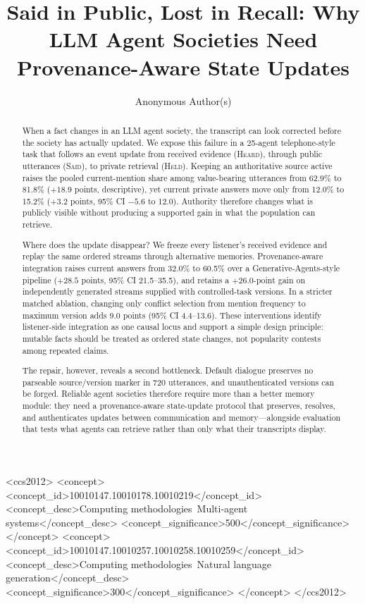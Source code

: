 \documentclass[sigconf,anonymous]{acmart}
\title[Said in Public, Lost in Recall]{Said in Public, Lost in Recall: Why LLM Agent Societies Need Provenance-Aware State Updates}
\author{Anonymous Author(s)}
\affiliation{%
  \institution{Anonymous Institution}
  \country{}
}
\newcommand{\heard}{\textsc{Heard}}
\newcommand{\said}{\textsc{Said}}
\newcommand{\held}{\textsc{Held}}
\begin{document}
\begin{abstract}
When a fact changes in an LLM agent society, the transcript can look corrected before the society
has actually updated.  We expose this failure in a 25-agent telephone-style task that follows an
event update from received evidence (\heard), through public utterances (\said), to private
retrieval (\held).  Keeping an authoritative source active raises the pooled current-mention share
among value-bearing utterances from 62.9\% to 81.8\% ($+18.9$ points, descriptive), yet current
private answers move only from 12.0\% to 15.2\% ($+3.2$ points, 95\% CI $-5.6$ to 12.0).
Authority therefore changes what is publicly visible without producing a supported gain in what
the population can retrieve.

Where does the update disappear?  We freeze every listener's received evidence and replay the same
ordered streams through alternative memories.  Provenance-aware integration raises current answers
from 32.0\% to 60.5\% over a Generative-Agents-style pipeline ($+28.5$ points, 95\% CI
21.5--35.5), and retains a $+26.0$-point gain on independently generated streams supplied with
controlled-task versions.  In a stricter matched ablation, changing only conflict selection from
mention frequency to maximum version adds 9.0 points (95\% CI 4.4--13.6).  These interventions
identify listener-side integration as one causal locus and support a simple design principle:
mutable facts should be treated as ordered state changes, not popularity contests among repeated
claims.

The repair, however, reveals a second bottleneck.  Default dialogue preserves no parseable
source/version marker in 720 utterances, and unauthenticated versions can be forged.  Reliable
agent societies therefore require more than a better memory module: they need a provenance-aware
state-update protocol that preserves, resolves, and authenticates updates between communication
and memory---alongside evaluation that tests what agents can retrieve rather than only what their
transcripts display.
\end{abstract}

\begin{CCSXML}
<ccs2012>
 <concept>
  <concept_id>10010147.10010178.10010219</concept_id>
  <concept_desc>Computing methodologies~Multi-agent systems</concept_desc>
  <concept_significance>500</concept_significance>
 </concept>
 <concept>
  <concept_id>10010147.10010257.10010258.10010259</concept_id>
  <concept_desc>Computing methodologies~Natural language generation</concept_desc>
  <concept_significance>300</concept_significance>
 </concept>
</ccs2012>
\end{CCSXML}
\end{document}
